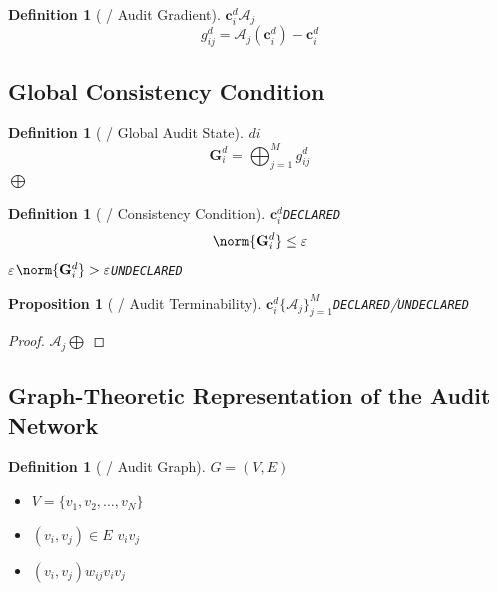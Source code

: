 \documentclass[12pt,a4paper]{article}
\newtheorem{proposition}[theorem]{Proposition}
\newtheorem{definition}[theorem]{Definition}
\theoremstyle{remark}
\newcommand{\UNDECLARED}{\texttt{UNDECLARED}}
\newcommand{\DECLARED}{\texttt{DECLARED}}
\newcommand{\auditnode}{\mathcal{A}}
\newcommand{\gradient}{g}
\begin{document}
\begin{definition}[ / Audit Gradient]
    $\mathbf{c}_i^d$$\auditnode_j$
    \begin{equation}
        \gradient_{ij}^d = \auditnode_j(\mathbf{c}_i^d) - \mathbf{c}_i^d
    \end{equation}
    
\end{definition}

\subsection{}
\subsection{Global Consistency Condition}

\begin{definition}[ / Global Audit State]
    $d$$i$
    \begin{equation}
        \mathbf{G}_i^d = \bigoplus_{j=1}^{M} \gradient_{ij}^d
    \end{equation}
    $\bigoplus$
\end{definition}

\begin{definition}[ / Consistency Condition]
    $\mathbf{c}_i^d$\DECLARED{}
    \begin{equation}
        \norm{\mathbf{G}_i^d} \leq \varepsilon
    \end{equation}
    $\varepsilon$$\norm{\mathbf{G}_i^d} > \varepsilon$\UNDECLARED
\end{definition}

\begin{proposition}[ / Audit Terminability]
    $\mathbf{c}_i^d$$\{\auditnode_j\}_{j=1}^{M}$\DECLARED/\UNDECLARED{}
\end{proposition}

\begin{proof}
    $\auditnode_j$$\bigoplus$
\end{proof}

\subsection{}
\subsection{Graph-Theoretic Representation of the Audit Network}

\begin{definition}[ / Audit Graph]
    $G = (V, E)$
    \begin{itemize}[nosep]
        \item $V = \{v_1, v_2, \ldots, v_N\}$ 
        \item $(v_i, v_j) \in E$ $v_i$$v_j$
        \item $(v_i, v_j)$$w_{ij}$$v_i$$v_j$
    \end{itemize}
\end{definition}
\end{document}
